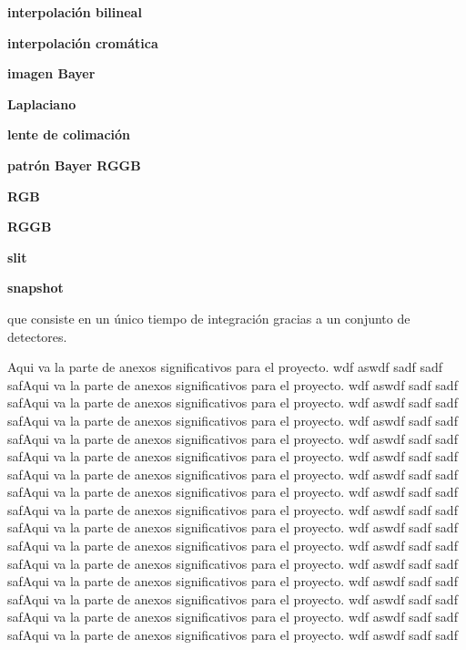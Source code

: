 
\label{Glosario}

\textbf{interpolación bilineal} 

\textbf{interpolación cromática} 

\textbf{imagen Bayer} 

\textbf{Laplaciano} 

\textbf{lente de colimación} 

\textbf{patrón Bayer RGGB} 

\textbf{RGB} 

\textbf{RGGB} 

\textbf{slit} 

\textbf{snapshot} 

que consiste en un único tiempo de integración gracias a un conjunto de detectores. 

Aqui va la parte de anexos significativos para el proyecto. wdf aswdf sadf sadf safAqui va la parte de anexos significativos para el proyecto. wdf aswdf sadf sadf safAqui va la parte de anexos significativos para el proyecto. wdf aswdf sadf sadf safAqui va la parte de anexos significativos para el proyecto. wdf aswdf sadf sadf safAqui va la parte de anexos significativos para el proyecto. wdf aswdf sadf sadf safAqui va la parte de anexos significativos para el proyecto. wdf aswdf sadf sadf safAqui va la parte de anexos significativos para el proyecto. wdf aswdf sadf sadf safAqui va la parte de anexos significativos para el proyecto. wdf aswdf sadf sadf safAqui va la parte de anexos significativos para el proyecto. wdf aswdf sadf sadf safAqui va la parte de anexos significativos para el proyecto. wdf aswdf sadf sadf safAqui va la parte de anexos significativos para el proyecto. wdf aswdf sadf sadf safAqui va la parte de anexos significativos para el proyecto. wdf aswdf sadf sadf safAqui va la parte de anexos significativos para el proyecto. wdf aswdf sadf sadf safAqui va la parte de anexos significativos para el proyecto. wdf aswdf sadf sadf safAqui va la parte de anexos significativos para el proyecto. wdf aswdf sadf sadf safAqui va la parte de anexos significativos para el proyecto. wdf aswdf sadf sadf 